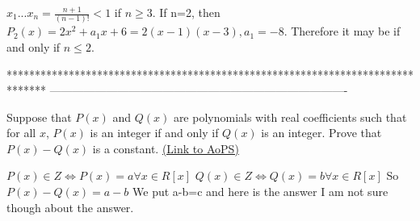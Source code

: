\begin{solution}
	$ x_{1}...x_{n}=\frac{n+1}{(n-1)!}<1$ if $ n\ge 3$. If n=2, then $ P_{2}(x)=2x^{2}+a_{1}x+6=2(x-1)(x-3),a_{1}=-8$.
Therefore it may be if and only if $ n\le 2$.
\end{solution}



*******************************************************************************
-------------------------------------------------------------------------------

\begin{problem}
	Suppose that $ P(x)$ and $Q(x)$ are polynomials with real coefficients such that for all $x$, $P(x)$ is an integer if and only if $Q(x)$ is an integer. Prove that $P(x)-Q(x)$ is a constant.
	\flushright \href{https://artofproblemsolving.com/community/c6h166088}{(Link to AoPS)}
\end{problem}



\begin{solution}
	$ P(x)\in Z\Leftrightarrow P(x)=a\forall x\in R[x]$
$ Q(x)\in Z\Leftrightarrow Q(x)=b\forall x\in R[x]$
So $ P(x)-Q(x) = a-b$
We put a-b=c and here is the answer
I am not sure though about the answer.
\end{solution}



